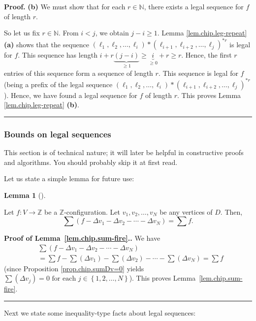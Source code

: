 \documentclass[numbers=enddot,12pt,final,onecolumn,notitlepage]{scrartcl}%
\theoremstyle{definition}
\newtheorem{lem}[theo]{Lemma}
\newenvironment{lemma}[1][]
{\begin{lem}[#1]\begin{leftbar}}
{\end{leftbar}\end{lem}}
\newenvironment{proof}[1][Proof]{\noindent\textbf{#1.} }{\ \rule{0.5em}{0.5em}}
\let\sumnonlimits\sum
\renewcommand{\sum}{\sumnonlimits\limits}
\newcommand{\ZZ}{\mathbb{Z}}
\newcommand{\tup}[1]{\left( #1 \right)}
\begin{document}
\begin{proof}
\textbf{(b)} We must show that for each $r\in\mathbb{N}$, there exists a legal
sequence for $f$ of length $r$.

So let us fix $r\in\mathbb{N}$. From $i<j$, we obtain $j-i\geq1$. Lemma
\ref{lem.chip.leg-repeat} \textbf{(a)} shows that the sequence $\left(
\ell_{1},\ell_{2},\ldots,\ell_{i}\right)  \ast\left(  \ell_{i+1},\ell
_{i+2},\ldots,\ell_{j}\right)  ^{\ast r}$ is legal for $f$. This sequence has
length $i+r\underbrace{\left(  j-i\right)  }_{\geq1}\geq\underbrace{i}_{\geq
0}+r\geq r$. Hence, the first $r$ entries of this sequence form a sequence of
length $r$. This sequence is legal for $f$ (being a prefix of the legal
sequence $\left(  \ell_{1},\ell_{2},\ldots,\ell_{i}\right)  \ast\left(
\ell_{i+1},\ell_{i+2},\ldots,\ell_{j}\right)  ^{\ast r}$). Hence, we have
found a legal sequence for $f$ of length $r$. This proves Lemma
\ref{lem.chip.leg-repeat} \textbf{(b)}.
\end{proof}

\subsubsection{Bounds on legal sequences}

This section is of technical nature; it will later be helpful
in constructive proofs and algorithms.
You should probably skip it at first read.

Let us state a simple lemma for future use:
\begin{lemma} \label{lem.chip.sum-fire}
Let $f : V \to \ZZ$ be a $\ZZ$-configuration.
Let $v_1, v_2, \ldots, v_N$ be any vertices of $D$.
Then,
\[
\sum \tup{f - \Delta v_1 - \Delta v_2 - \cdots - \Delta v_N}
= \sum f .
\]
\end{lemma}

\begin{proof}[Proof of Lemma~\ref{lem.chip.sum-fire}.]
We have
\begin{align*}
&  \sum\left(  f-\Delta v_{1}-\Delta v_{2}-\cdots-\Delta v_N\right)
\\
&  =\sum f-\sum\left(  \Delta v_{1}\right)  -\sum\left(  \Delta v
_{2}\right)  -\cdots-\sum\left(  \Delta v_N\right)
 =\sum f
\end{align*}
(since Proposition \ref{prop.chip.sumDv=0} yields
$\sum\left(  \Delta v_{j}\right)  =0\text{ for each }j\in\left\{
1,2,\ldots,N\right\}$).
This proves Lemma~\ref{lem.chip.sum-fire}.
\end{proof}

Next we state some inequality-type facts about legal sequences:
\end{document}
